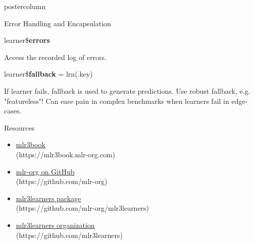 \documentclass{beamer}
\newcommand{\codeinline}[1]{\begin{codeboxinline}#1\end{codeboxinline}}
\begin{document}
\begin{withoutheader}
\begin{frame}[fragile]{}
\begin{columns}
\begin{column}{.245\textwidth}
\begin{beamercolorbox}[center]{postercolumn}
\begin{minipage}{.98\textwidth}
{\begin{myblock}{Error Handling and Encapsulation}
\begin{codeboxmultiline}[width=16cm]
							\end{codeboxmultiline}
							\begin{codebox}
								learner\$\textbf{errors}
							\end{codebox}
							Access the recorded log of errors.
							\vspace{1em}
							\\
							\begin{codebox}
								learner\$\textbf{fallback} = lrn(.key)
							\end{codebox}
							If learner fails, fallback is used to generate predictions. 
                            Use robust fallback, e.g. "featureless"! Can ease pain in complex benchmarks when learners fail in edge-cases.
						\end{myblock}
						\begin{myblock}{Resources}
							\begin{itemize}
								\item \href{https://mlr3book.mlr-org.com/index.html}{mlr3book}\\ (https://mlr3book.mlr-org.com)
								\item \href{https://github.com/mlr-org}{mlr-org on GitHub}\\ (https://github.com/mlr-org)
								\item \href{https://github.com/mlr-org/mlr3learners}{mlr3learners package}\\ (https://github.com/mlr-org/mlr3learners)
								\item \href{https://github.com/mlr3learners}{mlr3learners organization}\\ (https://github.com/mlr3learners)
							\end{itemize}
						\end{myblock}
						\vfill
					}
				\end{minipage}
			\end{beamercolorbox}
		\end{column}
	\end{columns}
\end{frame}
\end{withoutheader}
\end{document}
